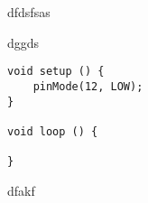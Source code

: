 \documentclass[12pt, a4paper]{article}
\begin{document}
\pagebreak

\par
\vspace*{1cm}
dfdsfsas

\vspace*{1cm}
dggds

\newpage
{}
\vspace{1cm}
\begin{center}
	\par
\end{center}


\vspace*{1cm}



\vspace*{1cm}

\begin{verbatim}
void setup () {
    pinMode(12, LOW);
}

void loop () {

}
\end{verbatim}

\vspace*{1cm}
dfakf
\end{document}
